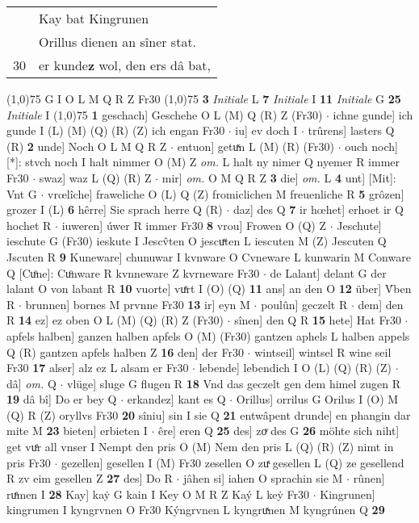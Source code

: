 \documentclass[8pt,a4paper,notitlepage]{article}
\begin{document}
\begin{table}[ht]
\begin{minipage}[t]{0.5\linewidth}
\begin{tabular}{rl}
 & Kay bat Kingrunen\\ 
 & Orillus dienen an sîner stat.\\ 
30 & er kunde\textbf{z} wol, den ers dâ bat,\\ 
\end{tabular}
\scriptsize
\line(1,0){75} \newline
G I O L M Q R Z Fr30 \newline
\line(1,0){75} \newline
\textbf{3} \textit{Initiale} L  \textbf{7} \textit{Initiale} I  \textbf{11} \textit{Initiale} G  \textbf{25} \textit{Initiale} I  \newline
\line(1,0){75} \newline
\textbf{1} geschach] Geschehe O L (M) Q (R) Z (Fr30)  $\cdot$ ichne gunde] ich gunde I (L) (M) (Q) (R) (Z) ich engan Fr30  $\cdot$ iu] ev doch I  $\cdot$ trûrens] lasters Q (R) \textbf{2} unde] Noch O L M Q R Z  $\cdot$ entuon] getuͯn L (M) (R) (Fr30)  $\cdot$ ouch noch] [*]: stvch noch I halt nimmer O (M) Z \textit{om.} L halt ny nimer Q nyemer R immer Fr30  $\cdot$ swaz] waz L (Q) (R) Z  $\cdot$ mir] \textit{om.} O M Q R Z \textbf{3} die] \textit{om.} L \textbf{4} unt] [Mit]: Vnt G  $\cdot$ vrœlîche] fraweliche O (L) Q (Z) fromiclichen M freuenliche R \textbf{5} grôzen] grozer I (L) \textbf{6} hêrre] Sie sprach herre Q (R)  $\cdot$ daz] des Q \textbf{7} ir hœhet] erhoet ir Q hochet R  $\cdot$ iuweren] úwer R immer Fr30 \textbf{8} vrou] Frowen O (Q) Z  $\cdot$ Jeschute] ieschute G (Fr30) ieskute I Jescv̂ten O jescuͯten L iescuten M (Z) Jescuten Q Jscuten R \textbf{9} Kuneware] chunuwar I kvnware O Cvneware L kunwarin M Conware Q [Cuͦne]: Cuͦnware R kvnneware Z kvrneware Fr30  $\cdot$ de Lalant] delant G der lalant O von labant R \textbf{10} vuorte] vuͤrt I (O) (Q) \textbf{11} ans] an den O \textbf{12} über] V́ben R  $\cdot$ brunnen] bornes M prvnne Fr30 \textbf{13} ir] eyn M  $\cdot$ poulûn] geczelt R  $\cdot$ dem] den R \textbf{14} ez] ez oben O L (M) (Q) (R) Z (Fr30)  $\cdot$ sînen] den Q R \textbf{15} hete] Hat Fr30  $\cdot$ apfels halben] ganzen halben apfels O (M) (Fr30) gantzen aphels L halben appels Q (R) gantzen apfels halben Z \textbf{16} den] der Fr30  $\cdot$ wintseil] wintsel R wine seil Fr30 \textbf{17} alser] alz ez L alsam er Fr30  $\cdot$ lebende] lebendich I O (L) (Q) (R) (Z)  $\cdot$ dâ] \textit{om.} Q  $\cdot$ vlüge] sluge G flugen R \textbf{18} Vnd das geczelt gen dem himel zugen R \textbf{19} dâ bî] Do er bey Q  $\cdot$ erkandez] kant es Q  $\cdot$ Orillus] orrilus G Orilus I (O) M (Q) R (Z) oryllvs Fr30 \textbf{20} sîniu] sin I sie Q \textbf{21} entwâpent drunde] en phangin dar mite M \textbf{23} bieten] erbieten I  $\cdot$ êre] eren Q \textbf{25} des] zoͮ des G \textbf{26} möhte sich niht] get vuͤr all vnser I Nempt den pris O (M) Nem den pris L (Q) (R) (Z) nimt in pris Fr30  $\cdot$ gezellen] gesellen I (M) Fr30 zesellen O zuͯ gesellen L (Q) ze gesellend R zv eim gesellen Z \textbf{27} des] Do R  $\cdot$ jâhen si] iahen O sprachin sie M  $\cdot$ rûnen] ruͤmen I \textbf{28} Kay] kaẏ G kain I Key O M R Z Kaý L keẏ Fr30  $\cdot$ Kingrunen] kingrumen I kyngrvnen O Fr30 Kýngrvnen L kyngruͯnen M kyngrúnen Q \textbf{29} 
\end{minipage}
\end{table}
\end{document}
